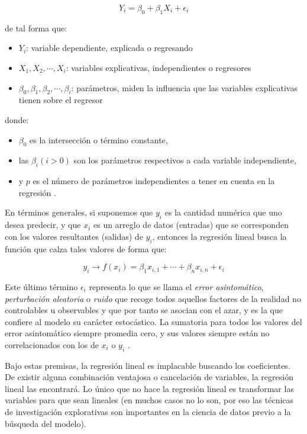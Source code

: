 \documentclass[letterpaper, spanish, 11pt]{report}
\begin{document}
\[Y_{i} = \beta_{0} + \beta_{1}X_{i} + \epsilon_{i}\]

\noindent de tal forma que:

\begin{itemize}
	\item[] \(Y_{i}\): variable dependiente, explicada o regresando
	\item[] \(X_{1},X_{2},\cdots ,X_{i}\): variables explicativas, independientes o regresores
	\item[] \(\beta_{0},\beta_{1},\beta_{2},\cdots ,\beta_{i}\): parámetros, miden la influencia que las variables explicativas tienen sobre el regresor
\end{itemize}

\noindent donde:

\begin{itemize}
	\item[] \(\beta_0\) es la intersección o término constante,
	\item[] las \(\beta _{i} (i>0)\) son los parámetros respectivos a cada variable independiente,
	\item[] y \(p\) es el número de parámetros independientes a tener en cuenta en la regresión \cite{yakir}.
\end{itemize}

En términos generales, si suponemos que $y_{i}$ es la cantidad numérica que uno desea predecir, y que $x_{i}$ es un arreglo de datos (entradas) que se corresponden con los valores resultantes (salidas) de $y_{i}$, entonces la regresión lineal busca la función que calza tales valores de forma que:

\[ y_{i} \rightarrow f(x_{i}) = \beta_{1}x_{i, 1} + \cdots + \beta_{n}x_{i, n} + \epsilon_{i} \]

Este último término $\epsilon_{i}$ representa lo que se llama el \emph{error asintomático}, \emph{perturbación aleatoria} o \emph{ruido} que recoge todos aquellos factores de la realidad no controlables u observables y que por tanto se asocian con el azar, y es la que confiere al modelo su carácter estocástico. La sumatoria para todos los valores del error asintomático siempre promedia cero, y sus valores siempre están no correlacionados con los de $x_{i}$ o $y_{i}$ \cite{zumelMount}.

Bajo estas premisas, la regresión lineal es implacable buscando los coeficientes. De existir alguna combinación ventajosa o cancelación de variables, la regresión lineal las encontrará. Lo único que no hace la regresión lineal es transformar las variables para que sean lineales (en muchos casos no lo son, por eso las técnicas de investigación explorativas son importantes en la ciencia de datos previo a la búsqueda del modelo).
\end{document}
